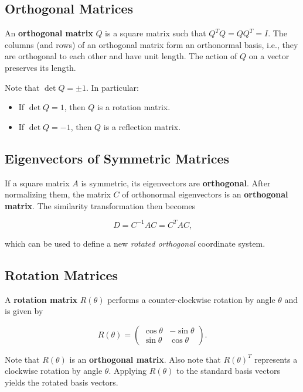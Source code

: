\subsection{Orthogonal Matrices}

An \textbf{orthogonal matrix} $Q$ is a square matrix such that $Q^TQ = QQ^T = I$. The columns (and rows) of an orthogonal matrix form an orthonormal basis, i.e., they are orthogonal to each other and have unit length. The action of $Q$ on a vector preserves its length.

Note that $\det Q = \pm 1$. In particular:

\begin{itemize}
    \item If $\det Q = 1$, then $Q$ is a rotation matrix.
    \item If $\det Q = -1$, then $Q$ is a reflection matrix.
\end{itemize}

\subsection{Eigenvectors of Symmetric Matrices}

If a square matrix $A$ is symmetric, its eigenvectors are \textbf{orthogonal}. After normalizing them, the matrix $C$ of orthonormal eigenvectors is an \textbf{orthogonal matrix}. The similarity transformation then becomes

\begin{equation*}
    D = C^{-1}AC = C^TAC\text{,}
\end{equation*}

which can be used to define a new \emph{rotated orthogonal} coordinate system.

\subsection{Rotation Matrices}

A \textbf{rotation matrix} $R(\theta)$ performs a counter-clockwise rotation by angle $\theta$ and is given by

\begin{equation*}
    R(\theta) = \begin{pmatrix}
        \cos \theta & -\sin \theta \\
        \sin \theta & \cos \theta
    \end{pmatrix}\text{.}
\end{equation*}

Note that $R(\theta)$ is an \textbf{orthogonal matrix}. Also note that $R(\theta)^T$ represents a clockwise rotation by angle $\theta$. Applying $R(\theta)$ to the standard basis vectors yields the rotated basis vectors.

